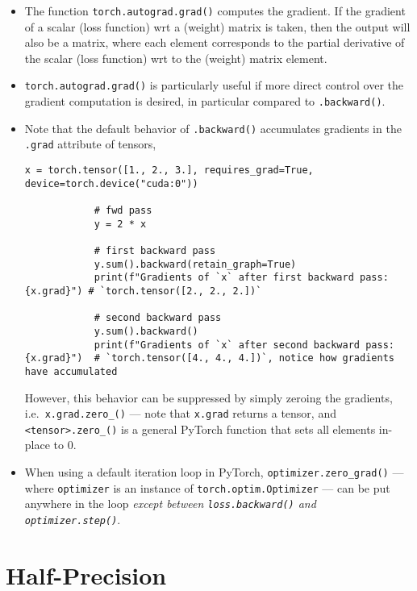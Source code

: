 \documentclass[12pt, a4paper]{scrbook}
\numberwithin{equation}{section}
\theoremstyle{definition}
\theoremstyle{definition}
\begin{document}
	\begin{itemize}
		\item The function \texttt{torch.autograd.grad()} computes the gradient. If the gradient of a scalar (loss function) wrt a (weight) matrix is taken, then the output will also be a matrix, where each element corresponds to the partial derivative of the scalar (loss function) wrt to the (weight) matrix element.
		
		\item \texttt{torch.autograd.grad()} is particularly useful if more direct control over the gradient computation is desired, in particular compared to \texttt{.backward()}.
		
		\item Note that the default behavior of \texttt{.backward()} accumulates gradients in the \texttt{.grad} attribute of tensors,
		
		\begin{lstlisting}[style=mystylepython, label=alg:torch_backward, xleftmargin=\parindent]
			x = torch.tensor([1., 2., 3.], requires_grad=True, device=torch.device("cuda:0"))
			
			# fwd pass
			y = 2 * x
			
			# first backward pass
			y.sum().backward(retain_graph=True)
			print(f"Gradients of `x` after first backward pass: {x.grad}") # `torch.tensor([2., 2., 2.])`
			
			# second backward pass
			y.sum().backward()
			print(f"Gradients of `x` after second backward pass: {x.grad}")  # `torch.tensor([4., 4., 4.])`, notice how gradients have accumulated
		\end{lstlisting}
		
		However, this behavior can be suppressed by simply zeroing the gradients, i.e.~\texttt{x.grad.zero_()} --- note that \texttt{x.grad} returns a tensor, and \texttt{<tensor>.zero\_()} is a general PyTorch function that sets all elements in-place to $0$.
		
		\item When using a default iteration loop in PyTorch, \texttt{optimizer.zero_grad()} --- where \texttt{optimizer} is an instance of \texttt{torch.optim.Optimizer} --- can be put anywhere in the loop \textit{except between \texttt{loss.backward()} and \texttt{optimizer.step()}}.
		
	\end{itemize} 

	\section{Half-Precision}
	
\end{document}
